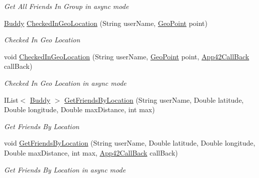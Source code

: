 \begin{DoxyCompactItemize}
\begin{DoxyCompactList}\small\item\em Get All Friends In Group in async mode \end{DoxyCompactList}\item 
\hyperlink{classcom_1_1shephertz_1_1app42_1_1paas_1_1sdk_1_1csharp_1_1buddy_1_1_buddy}{Buddy} \hyperlink{classcom_1_1shephertz_1_1app42_1_1paas_1_1sdk_1_1csharp_1_1buddy_1_1_buddy_service_a1c8a141acfaf3c333a23f22858c062e5}{Checked\+In\+Geo\+Location} (String user\+Name, \hyperlink{classcom_1_1shephertz_1_1app42_1_1paas_1_1sdk_1_1csharp_1_1geo_1_1_geo_point}{Geo\+Point} point)
\begin{DoxyCompactList}\small\item\em Checked In Geo Location \end{DoxyCompactList}\item 
void \hyperlink{classcom_1_1shephertz_1_1app42_1_1paas_1_1sdk_1_1csharp_1_1buddy_1_1_buddy_service_a97eb71d786795e36ff552d3bf184de83}{Checked\+In\+Geo\+Location} (String user\+Name, \hyperlink{classcom_1_1shephertz_1_1app42_1_1paas_1_1sdk_1_1csharp_1_1geo_1_1_geo_point}{Geo\+Point} point, \hyperlink{interfacecom_1_1shephertz_1_1app42_1_1paas_1_1sdk_1_1csharp_1_1_app42_call_back}{App42\+Call\+Back} call\+Back)
\begin{DoxyCompactList}\small\item\em Checked In Geo Location in async mode \end{DoxyCompactList}\item 
I\+List$<$ \hyperlink{classcom_1_1shephertz_1_1app42_1_1paas_1_1sdk_1_1csharp_1_1buddy_1_1_buddy}{Buddy} $>$ \hyperlink{classcom_1_1shephertz_1_1app42_1_1paas_1_1sdk_1_1csharp_1_1buddy_1_1_buddy_service_a12eb228d92d28788b47dc96703c72416}{Get\+Friends\+By\+Location} (String user\+Name, Double latitude, Double longitude, Double max\+Distance, int max)
\begin{DoxyCompactList}\small\item\em Get Friends By Location \end{DoxyCompactList}\item 
void \hyperlink{classcom_1_1shephertz_1_1app42_1_1paas_1_1sdk_1_1csharp_1_1buddy_1_1_buddy_service_ac8c3dc5c2ed5a02389848c0685fa2b4e}{Get\+Friends\+By\+Location} (String user\+Name, Double latitude, Double longitude, Double max\+Distance, int max, \hyperlink{interfacecom_1_1shephertz_1_1app42_1_1paas_1_1sdk_1_1csharp_1_1_app42_call_back}{App42\+Call\+Back} call\+Back)
\begin{DoxyCompactList}\small\item\em Get Friends By Location in async mode \end{DoxyCompactList}\item 

\end{DoxyCompactItemize}
